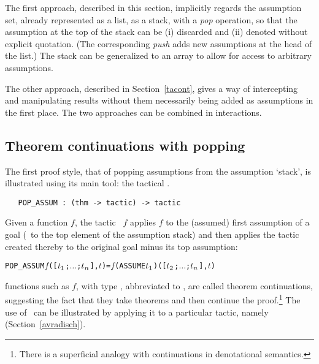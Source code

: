 The first
approach, described in this section, implicitly regards the assumption
set, already represented as a list, as a stack, with a {\it pop\/}
operation, so that the assumption at the top of the stack can be (i) discarded
and (ii) denoted without explicit quotation.  (The corresponding {\it push\/}
adds new assumptions at the head of the list.)
The stack can be generalized to an array to allow for access to
arbitrary assumptions.

The other approach, described in Section~\ref{tacont},
gives a way of intercepting and manipulating results without them necessarily
being added as assumptions in the first place.  The two approaches can
be combined in \HOL{} interactions.


\subsection{Theorem continuations with popping}
\label{avra_manip1}

The first proof style, that of popping assumptions
from the assumption `stack',
is illustrated using its main tool: the tactical .

\begin{boxed}\begin{verbatim}
   POP_ASSUM : (thm -> tactic) -> tactic
\end{verbatim}\end{boxed}

\noindent Given a function $f$, the tactic
\ $f$ applies $f$ to the (assumed) first
assumption of a goal (\ie\ to the top element of the assumption stack)
and then applies the tactic created thereby to the original goal
minus its top assumption:

\begin{hol}\begin{alltt}
   POP_ASSUM \(f\) ([\(t\sb{1}\);\(\ldots\);\(t\sb{n}\)],\(t\)) = \(f\) (ASSUME \(t\sb{1}\)) ([\(t\sb{2}\);\(\ldots\);\(t\sb{n}\)],\(t\))
\end{alltt}\end{hol}

\noindent \ML{} functions such as $f$,
with type , abbreviated to ,
are called theorem continuations,
 suggesting the fact that they
take theorems and then continue the proof.\footnote{There is a superficial analogy
with continuations in denotational semantics.}
The use of \ can be illustrated by applying it
to a particular tactic, namely  (Section~\ref{avradisch}).

